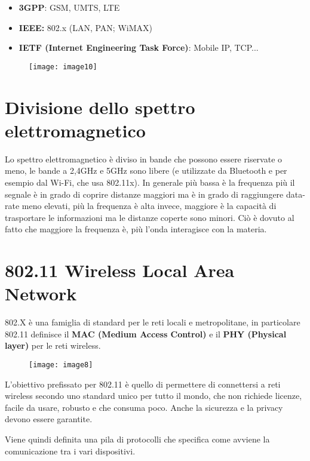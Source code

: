 \begin{itemize}
\item
  \textbf{3GPP}: GSM, UMTS, LTE
\item
  \textbf{IEEE:} 802.x (LAN, PAN; WiMAX)
\item
  \textbf{IETF (Internet Engineering Task Force)}: Mobile IP,
  TCP...
\end{itemize}

\begin{figure}[H]
	\centering
	\texttt{[image: image10]}
\end{figure}
\FloatBarrier

\section{Divisione dello spettro elettromagnetico}
Lo spettro elettromagnetico è diviso in bande che possono essere riservate o
meno, le bande a 2,4GHz e 5GHz sono libere (e utilizzate da Bluetooth e per
esempio dal Wi-Fi, che usa 802.11x). In generale più bassa è la frequenza più il
segnale è in grado di coprire distanze maggiori ma è in grado di raggiungere
data-rate meno elevati, più la frequenza è alta invece, maggiore è la capacità
di trasportare le informazioni ma le distanze coperte sono minori. Ciò è dovuto
al fatto che maggiore la frequenza è, più l'onda interagisce con la materia.

\section{802.11 Wireless Local Area Network}
\label{wireless-local-area-network}

802.X è una famiglia di standard per le reti locali e metropolitane, in
particolare 802.11 definisce il \textbf{MAC (Medium Access Control)} e
il \textbf{PHY (Physical layer)} per le reti wireless.

\begin{figure}[H]
  \centering
  \texttt{[image: image8]}
\end{figure}

L'obiettivo prefissato per 802.11 è quello di permettere di connettersi
a reti wireless secondo uno standard unico per tutto il mondo, che non
richiede licenze, facile da usare, robusto e che consuma poco. Anche la sicurezza
e la privacy devono essere garantite.

Viene quindi definita una pila di protocolli che specifica come avviene
la comunicazione tra i vari dispositivi.

